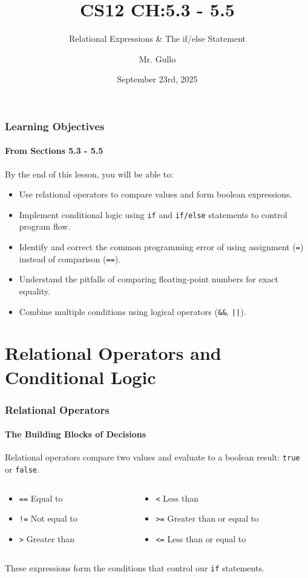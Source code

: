 \documentclass{beamer}
\title[Short Title]{CS12 CH:5.3 - 5.5}
\subtitle{Relational Expressions \& The if/else Statement}
\author[Mr. Gullo]{Mr. Gullo}
\date[Sep 23]{September 23rd, 2025}
\begin{document}
\frame{\titlepage}

\begin{frame}
\frametitle{Learning Objectives}
\framesubtitle{From Sections 5.3 - 5.5}
By the end of this lesson, you will be able to:
\begin{itemize}
    \item Use relational operators to compare values and form boolean expressions.
    \item Implement conditional logic using \texttt{if} and \texttt{if/else} statements to control program flow.
    \item Identify and correct the common programming error of using assignment (\texttt{=}) instead of comparison (\texttt{==}).
    \item Understand the pitfalls of comparing floating-point numbers for exact equality.
    \item Combine multiple conditions using logical operators (\texttt{\&\&}, \texttt{||}).
\end{itemize}
\end{frame}

\section{Relational Operators and Conditional Logic}

\begin{frame}
\frametitle{Relational Operators}
\framesubtitle{The Building Blocks of Decisions}
Relational operators compare two values and evaluate to a boolean result: \texttt{true} or \texttt{false}.

\begin{columns}[T]
    \begin{column}{0.5\textwidth}
        \begin{itemize}
            \item \texttt{==} \quad Equal to
            \item \texttt{!=} \quad Not equal to
            \item \texttt{>}  \quad Greater than
        \end{itemize}
    \end{column}
    \begin{column}{0.5\textwidth}
        \begin{itemize}
            \item \texttt{<}  \quad Less than
            \item \texttt{>=} \quad Greater than or equal to
            \item \texttt{<=} \quad Less than or equal to
        \end{itemize}
    \end{column}
\end{columns}

\pause

These expressions form the \alert{conditions} that control our \texttt{if} statements.
\end{frame}
\end{document}
